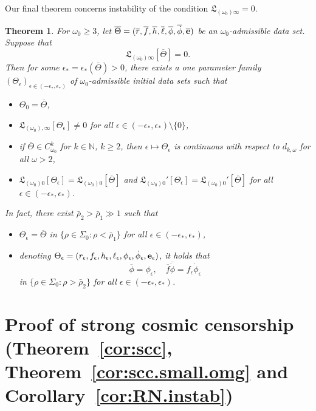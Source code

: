 \documentclass[10pt, reqno]{amsart}
\newtheorem{theorem}{Theorem}[section]
\theoremstyle{definition}
\theoremstyle{remark}
\numberwithin{equation}{section}
\newcommand{\set}[1]{\{#1\}}
\newcommand{\0}{\emptyset}
\newcommand{\eps}{\epsilon}
\newcommand{\Sgm}{\Sigma}
\newcommand{\Tht}{\Theta}
\newcommand{\omg}{\omega}
\newcommand{\bfe}{{\bf e}}
\newcommand{\e}{\bfe}							%
\newcommand{\phibg}{\overline{\phi}}				%
\newcommand{\rbg}{\overline{r}}					%
\newcommand{\ebg}{\overline{\e}}					%
\newcommand{\fbg}{\overline{f}}
\newcommand{\hbg}{\overline{h}}
\newcommand{\ellbg}{\overline{\ell}}
\newcommand{\dphibg}{\overline{\dot{\phi}}}
\begin{document}
Our final theorem concerns instability of the condition $\mathfrak{L}_{(\omg_{0}) \infty} = 0$. 
\begin{theorem} \label{thm:instability}
For $\omg_{0} \geq 3$, let $\overline{\Tht} = (\rbg, \fbg, \hbg, \ellbg, \phibg, \dphibg, \ebg)$ be an $\omg_{0}$-admissible data set. 
Suppose that
\begin{equation*}
	\mathfrak{L}_{(\omg_{0}) \infty} [\overline{\Tht}] = 0.
\end{equation*}
Then for some $\eps_{\ast} = \eps_{\ast}(\overline{\Tht}) > 0$, there exists a one parameter family $(\Tht_{\eps})_{\eps \in (-\eps_{\ast}, \eps_{\ast})}$ of $\omg_{0}$-admissible initial data sets such that 
\begin{itemize}
\item $\Tht_{0} = \overline{\Tht}$, 
\item $\mathfrak{L}_{(\omg_{0}), \infty}[\Tht_{\eps}] \neq 0$ for all $\eps \in (-\eps_{\ast}, \eps_{\ast})\setminus\{0\}$,
\item if $\overline{\Theta}\in C^k_{\omg_0}$ for $k\in\mathbb N$, $k\geq 2$, then $\eps \mapsto \Tht_{\eps}$ is continuous with respect to $d_{k, \omg}$ for all $\omg > 2$, 
\item $\mathfrak{L}_{(\omg_{0}) 0}[\Tht_{\eps}] = \mathfrak{L}_{(\omg_{0}) 0}[\overline{\Tht}]$ and $\mathfrak{L}_{(\omg_{0}) 0}'[\Tht_{\eps}] = \mathfrak{L}_{(\omg_{0}) 0}'[\overline{\Tht}]$ for all $\eps \in (-\eps_{\ast}, \eps_{\ast})$.
\end{itemize}
In fact, there exist $\bar{\rho}_{2} > \bar{\rho}_{1} \gg 1$ such that 
\begin{itemize}
\item $\Tht_{\eps} = \overline{\Tht}$ in $\set{\rho \in \Sgm_{0} : \rho < \bar{\rho}_{1}}$ for all $\eps \in (-\eps_{\ast}, \eps_{\ast})$,
\item denoting $\Tht_\eps = (r_\eps, f_\eps, h_\eps, \ell_\eps, \phi_\eps, \dot{\phi}_\eps, \e_\eps)$, it holds that
$$\overline{\phi}=\phi_\eps,\quad \fbg \overline{\dot{\phi}}=f_\eps \dot{\phi}_\eps $$
in $\set{\rho \in \Sgm_{0} : \rho > \bar{\rho}_{2}}$ for all $\eps \in (-\eps_{\ast}, \eps_{\ast})$.
\end{itemize}
\end{theorem}

\section{Proof of strong cosmic censorship (Theorem~\ref{cor:scc}, Theorem~\ref{cor:scc.small.omg} and Corollary~\ref{cor:RN.instab})}\label{sec.pf.SCC}
\end{document}
